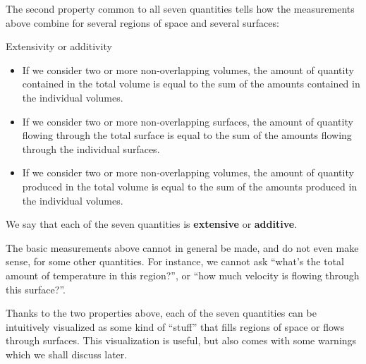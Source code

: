 \documentclass[a4paper,12pt,%
onecolumn,oneside,%
british%
]{memoir}
\renewcommand*{\|}[1][]{\nonscript\:#1\vert\nonscript\:\mathopen{}}
\begin{document}
The second property common to all seven quantities tells how the measurements above combine for several regions of space and several surfaces:
\begin{definition}{Extensivity or additivity}\label{def:extensivity}
\begin{itemize}[leftmargin=17.62pt]
\item If we consider two or more non-overlapping volumes, the amount of quantity contained in the total volume is equal to the sum of the amounts contained in the individual volumes.

\item If we consider two or more non-overlapping surfaces, the amount of quantity flowing through the total surface is equal to the sum of the amounts flowing through the individual surfaces.

\item If we consider two or more non-overlapping volumes, the amount of quantity produced in the total volume is equal to the sum of the amounts produced in the individual volumes.
  \end{itemize}

We say that each of the seven quantities is \textbf{extensive} or \textbf{additive}.
\end{definition}



\medskip

The basic measurements above cannot in general be made, and do not even make sense, for some other quantities. For instance, we cannot ask \enquote{what's the total amount of temperature in this region?}, or \enquote{how much velocity is flowing through this surface?}.

\medskip

Thanks to the two properties above, each of the seven quantities can be intuitively visualized as some kind of \enquote{stuff} that fills regions of space or flows through surfaces. This visualization is useful, but also comes with some warnings which we shall discuss later.

\end{document}
